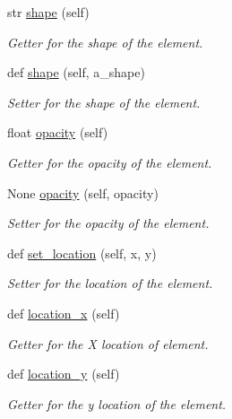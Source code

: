 \begin{DoxyCompactItemize}
$$str \mbox{\hyperlink{classbridges_1_1element__visualizer_1_1_element_visualizer_a1a776963fc8564f010767457d5ea9118}{shape}} (self)
\begin{DoxyCompactList}\small\item\em Getter for the shape of the element. \end{DoxyCompactList}\item 
def \mbox{\hyperlink{classbridges_1_1element__visualizer_1_1_element_visualizer_af4bd377b8fb9a35c10740de7ea8c5eee}{shape}} (self, a\+\_\+shape)
\begin{DoxyCompactList}\small\item\em Setter for the shape of the element. \end{DoxyCompactList}\item 
float \mbox{\hyperlink{classbridges_1_1element__visualizer_1_1_element_visualizer_aaa4463337cf50610f4ee230bcdf2e483}{opacity}} (self)
\begin{DoxyCompactList}\small\item\em Getter for the opacity of the element. \end{DoxyCompactList}\item 
None \mbox{\hyperlink{classbridges_1_1element__visualizer_1_1_element_visualizer_ab0fe9377e980e9226e10177036a8d1cf}{opacity}} (self, opacity)
\begin{DoxyCompactList}\small\item\em Setter for the opacity of the element. \end{DoxyCompactList}\item 
def \mbox{\hyperlink{classbridges_1_1element__visualizer_1_1_element_visualizer_a7aef4402f2de7e88a3260bbec3a708a7}{set\+\_\+location}} (self, x, y)
\begin{DoxyCompactList}\small\item\em Setter for the location of the element. \end{DoxyCompactList}\item 
def \mbox{\hyperlink{classbridges_1_1element__visualizer_1_1_element_visualizer_a10fc24a04e43afcb393f3444bd93f5d9}{location\+\_\+x}} (self)
\begin{DoxyCompactList}\small\item\em Getter for the X location of element. \end{DoxyCompactList}\item 
def \mbox{\hyperlink{classbridges_1_1element__visualizer_1_1_element_visualizer_a687747f04ae17dea9d15706602688a32}{location\+\_\+y}} (self)
\begin{DoxyCompactList}\small\item\em Getter for the y location of the element. \end{DoxyCompactList}\end{DoxyCompactItemize}
